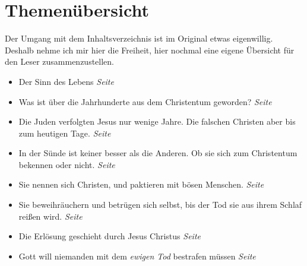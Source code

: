 \chapter{Themenübersicht} \label{ref:theme_nuebersicht}


Der Umgang mit dem Inhaltsverzeichnis ist im Original etwas eigenwillig. Deshalb
nehme ich mir hier die Freiheit, hier nochmal eine eigene Übersicht für den
Leser zusammenzustellen.


\begin{itemize}
 \item Der Sinn des Lebens
 \dotfill \textit{Seite~\pageref{ref:vorw_sinndes_lebens}}\\

 \item Was ist über die Jahrhunderte aus dem Christentum geworden?
 \dotfill \textit{Seite~\pageref{ref:01_02_urchristentum}}\\

 \item Die Juden verfolgten Jesus nur wenige Jahre. Die falschen Christen aber
bis zum heutigen Tage.
 \dotfill \textit{Seite~\pageref{ref:01_04_zweite_kreuzigung}}\\

 \item In der Sünde ist keiner besser als die Anderen. Ob sie sich zum
Christentum bekennen oder nicht.
 \dotfill \textit{Seite~\pageref{ref:01_05_in_suende_gleich}}\\

 \item Sie nennen sich Christen, und paktieren mit bösen Menschen.
 \dotfill \textit{Seite~\pageref{ref:01_05_in_suende_verbinden}}\\

 \item Sie beweihräuchern und betrügen sich selbst, bis der Tod sie aus ihrem
Schlaf reißen wird.
 \dotfill \textit{Seite~\pageref{ref:01_07_selbstbetrug}}\\

 \item Die Erlösung geschieht durch Jesus Christus
 \dotfill \textit{Seite~\pageref{ref:01_10_jesus_der_erloeser}}\\

 \item Gott will niemanden mit dem \textit{ewigen Tod} bestrafen müssen
 \dotfill \textit{Seite~\pageref{ref:02_02_kein_gefallen_am_tod}}\\


\end{itemize}
